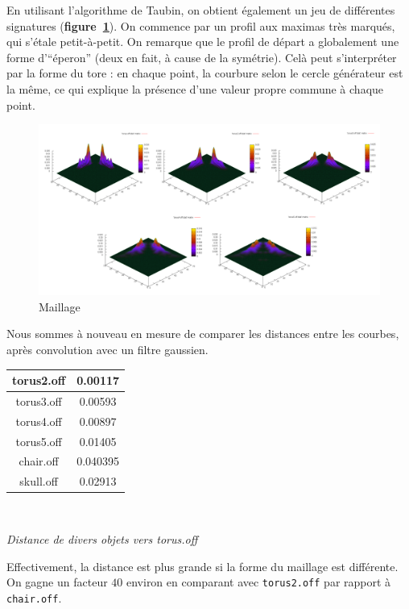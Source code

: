 \documentclass{llncs}
\begin{document}
En utilisant l'algorithme de Taubin, on obtient également un jeu de différentes signatures (\textbf{figure~\ref{tore_taubin}}). On commence par un profil aux maximas très marqués, qui s'étale petit-à-petit. On remarque que le profil de départ a globalement une forme d'``éperon'' (deux en fait, à cause de la symétrie). Celà peut s'interpréter par la forme du tore : en chaque point, la courbure selon le cercle générateur est la même, ce qui explique la présence d'une valeur propre commune à chaque point.

\begin{figure}
\center
\includegraphics[width=12cm]{img/tores_taubin.png}
\caption{Maillage}
\label{tore_taubin}
\end{figure}

Nous sommes à nouveau en mesure de comparer les distances entre les courbes, après convolution avec un filtre gaussien.

\begin{center}
\begin{tabular}{|c|c|}
\hline torus2.off & 0.00117 \\ 
\hline torus3.off & 0.00593 \\ 
\hline torus4.off & 0.00897 \\ 
\hline torus5.off & 0.01405 \\ 
\hline chair.off & 0.040395 \\ 
\hline skull.off & 0.02913 \\ 
\hline 
\end{tabular} \\
\begin{small}
\textit{Distance de divers objets vers torus.off}
\end{small}
\end{center}

Effectivement, la distance est plus grande si la forme du maillage est différente. On gagne un facteur $40$ environ en comparant avec \texttt{torus2.off} par rapport à \texttt{chair.off}.
\end{document}
